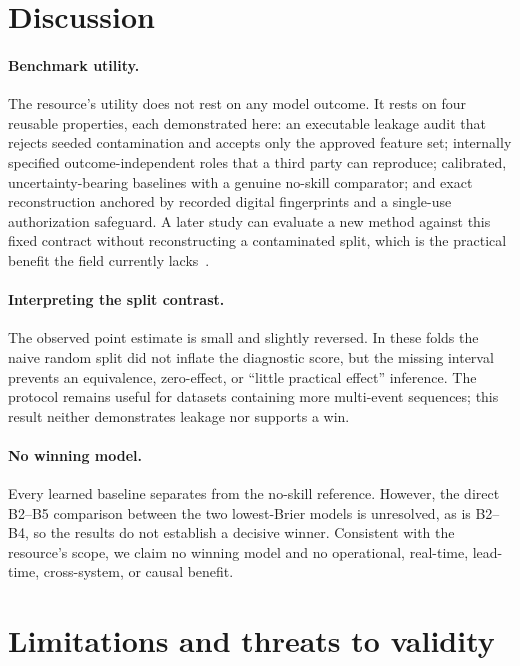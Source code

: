 \documentclass[pdflatex,sn-basic,iicol]{sn-jnl}
\begin{document}
\section{Discussion}\label{sec:discussion}

\paragraph{Benchmark utility.} The resource's utility does not rest on any model
outcome. It rests on four reusable properties, each demonstrated here: an
executable leakage audit that rejects seeded contamination and accepts only the
approved feature set; internally specified outcome-independent roles that a third party
can reproduce; calibrated, uncertainty-bearing baselines with a genuine no-skill
comparator; and exact reconstruction anchored by recorded digital
fingerprints and a single-use authorization safeguard. A later study can evaluate a
new method against
this fixed contract without reconstructing a contaminated split, which is the
practical benefit the field currently lacks~\citep{patelli2026macroseismic,
mori2025explainable,roberts2017cv}.

\paragraph{Interpreting the split contrast.} The observed point estimate is
small and slightly reversed. In these folds the naive random split did not
inflate the diagnostic score, but the missing interval prevents an equivalence,
zero-effect, or ``little practical effect'' inference. The protocol remains
useful for datasets containing more multi-event sequences; this result neither
demonstrates leakage nor supports a win.

\paragraph{No winning model.} Every learned baseline separates from the no-skill
reference. However, the direct B2--B5 comparison between the two lowest-Brier
models is unresolved, as is B2--B4, so the results do not establish a decisive
winner. Consistent with the resource's scope, we claim no winning model and no
operational, real-time, lead-time, cross-system, or causal benefit.

\section{Limitations and threats to validity}\label{sec:limitations}
\end{document}
